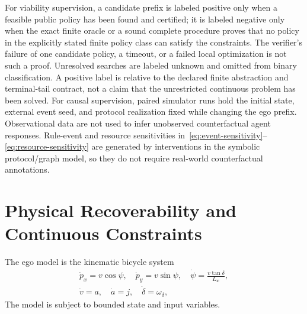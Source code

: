\documentclass[letterpaper]{article} %
\begin{document}
For viability supervision, a candidate prefix is labeled positive only when a feasible public policy has been found and certified; it is labeled negative only when the exact finite oracle or a sound complete procedure proves that no policy in the explicitly stated finite policy class can satisfy the constraints. The verifier's failure of one candidate policy, a timeout, or a failed local optimization is not such a proof. Unresolved searches are labeled unknown and omitted from binary classification. A positive label is relative to the declared finite abstraction and terminal-tail contract, not a claim that the unrestricted continuous problem has been solved. For causal supervision, paired simulator runs hold the initial state, external event seed, and protocol realization fixed while changing the ego prefix. Observational data are not used to infer unobserved counterfactual agent responses. Rule-event and resource sensitivities in~\eqref{eq:event-sensitivity}--\eqref{eq:resource-sensitivity} are generated by interventions in the symbolic protocol/graph model, so they do not require real-world counterfactual annotations.

\section{Physical Recoverability and Continuous Constraints}
\label{app:physical}
The ego model is the kinematic bicycle system
\begin{gather}
\dot p_x=v\cos\psi,\quad \dot p_y=v\sin\psi,\quad
\dot\psi=\frac{v\tan\delta}{L_w},\nonumber\\
\dot v=a,\quad\dot a=j,\quad\dot\delta=\omega_\delta,
\label{eq:bicycle}
\end{gather}
The model is subject to bounded state and input variables.
\end{document}
